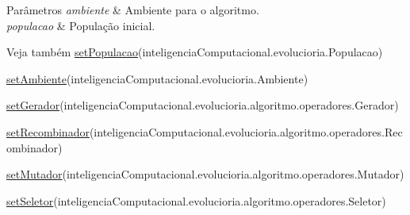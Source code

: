 \begin{DoxyParams}{Parâmetros}
{\em ambiente} & Ambiente para o algoritmo. \\
\hline
{\em populacao} & População inicial.\\
\hline
\end{DoxyParams}
\begin{DoxySeeAlso}{Veja também}
\hyperlink{classic_1_1populacional_1_1algoritmo_1_1_algoritmo_evolucionario_3_01_g_01extends_01_number_00_0bd52af860edf752f8985460efb0aa102_af0c96a46679b2488c0facb48e50c1b08}{set\-Populacao}(inteligencia\-Computacional.\-evolucioria.\-Populacao) 

\hyperlink{classic_1_1populacional_1_1algoritmo_1_1_algoritmo_evolucionario_3_01_g_01extends_01_number_00_0bd52af860edf752f8985460efb0aa102_a9b7ac1c107c13b4e9d8023cedaec2e06}{set\-Ambiente}(inteligencia\-Computacional.\-evolucioria.\-Ambiente) 

\hyperlink{classic_1_1populacional_1_1algoritmo_1_1_algoritmo_evolucionario_3_01_g_01extends_01_number_00_0bd52af860edf752f8985460efb0aa102_a406d4a36808a9f143b59edef5256b720}{set\-Gerador}(inteligencia\-Computacional.\-evolucioria.\-algoritmo.\-operadores.\-Gerador) 

\hyperlink{classic_1_1populacional_1_1algoritmo_1_1_algoritmo_evolucionario_3_01_g_01extends_01_number_00_0bd52af860edf752f8985460efb0aa102_a3294985c0b68bc7d20a8d77e932e15ee}{set\-Recombinador}(inteligencia\-Computacional.\-evolucioria.\-algoritmo.\-operadores.\-Recombinador) 

\hyperlink{classic_1_1populacional_1_1algoritmo_1_1_algoritmo_evolucionario_3_01_g_01extends_01_number_00_0bd52af860edf752f8985460efb0aa102_a925ccb23537df330b998f518d037c7f9}{set\-Mutador}(inteligencia\-Computacional.\-evolucioria.\-algoritmo.\-operadores.\-Mutador) 

\hyperlink{classic_1_1populacional_1_1algoritmo_1_1_algoritmo_evolucionario_3_01_g_01extends_01_number_00_0bd52af860edf752f8985460efb0aa102_a645a1c47dea80d12448a9be02a2504dd}{set\-Seletor}(inteligencia\-Computacional.\-evolucioria.\-algoritmo.\-operadores.\-Seletor) 
\end{DoxySeeAlso}


